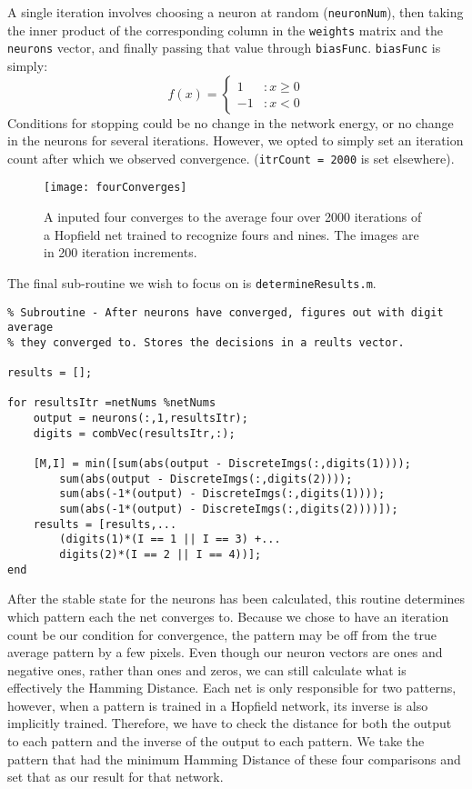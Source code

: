 \documentclass[]{article}
\theoremstyle{plain}
\theoremstyle{definition}
\begin{document}
A single iteration involves choosing a neuron at random (\texttt{neuronNum}), then taking the inner product of the corresponding column in the \texttt{weights} matrix and the \texttt{neurons} vector, and finally passing that value through \texttt{biasFunc}. \texttt{biasFunc} is simply:
\[ f(x) = \left\{\begin{array}{cc}
1 &: x \geq 0\\
-1 &: x < 0
\end{array}\right. \]
Conditions for stopping could be no change in the network energy, or no change in the neurons for several iterations. However, we opted to simply set an iteration count after which we observed convergence. (\texttt{itrCount = 2000} is set elsewhere).

\begin{figure}[h]
\centering
\texttt{[image: fourConverges]}
\caption{A inputed four converges to the average four over 2000 iterations of a Hopfield net trained to recognize fours and nines. The images are in 200 iteration increments.}
\end{figure}

\newpage

The final sub-routine we wish to focus on is \texttt{determineResults.m}.
\singlespacing
\begin{verbatim}
% Subroutine - After neurons have converged, figures out with digit average
% they converged to. Stores the decisions in a reults vector. 

results = []; 

for resultsItr =netNums %netNums
    output = neurons(:,1,resultsItr);
    digits = combVec(resultsItr,:);

    [M,I] = min([sum(abs(output - DiscreteImgs(:,digits(1))));
        sum(abs(output - DiscreteImgs(:,digits(2))));
        sum(abs(-1*(output) - DiscreteImgs(:,digits(1))));
        sum(abs(-1*(output) - DiscreteImgs(:,digits(2))))]);
    results = [results,...
        (digits(1)*(I == 1 || I == 3) +...
        digits(2)*(I == 2 || I == 4))]; 
end
\end{verbatim}
\doublespacing
\quad After the stable state for the neurons has been calculated, this routine determines which pattern each the net converges to. Because we chose to have an iteration count be our condition for convergence, the pattern may be off from the true average pattern by a few pixels. Even though our neuron vectors are ones and negative ones, rather than ones and zeros, we can still calculate what is effectively the Hamming Distance. Each net is only responsible for two patterns, however, when a pattern is trained in a Hopfield network, its inverse is also implicitly trained. Therefore, we have to check the distance for both the output to each pattern and the inverse of the output to each pattern. We take the pattern that had the minimum Hamming Distance of these four comparisons and set that as our result for that network. 
\end{document}

